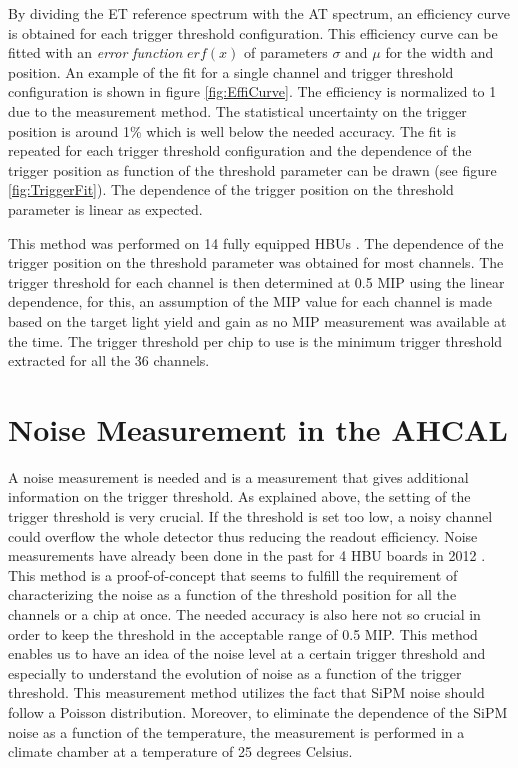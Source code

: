 By dividing the ET reference spectrum with the AT spectrum, an efficiency curve is obtained for each trigger threshold configuration. This efficiency curve can be fitted with an \textit{error function} $erf(x)$ of parameters $\sigma$ and $\mu$ for the width and position. An example of the fit for a single channel and trigger threshold configuration is shown in figure \ref{fig:EffiCurve}. The efficiency is normalized to 1 due to the measurement method. The statistical uncertainty on the trigger position is around 1\% which is well below the needed accuracy. The fit is repeated for each trigger threshold configuration and the dependence of the trigger position as function of the threshold parameter can be drawn (see figure \ref{fig:TriggerFit}). The dependence of the trigger position on the threshold parameter is linear as expected.

This method was performed on 14 fully equipped HBUs \cite{LloydTrigger}. The dependence of the trigger position on the threshold parameter was obtained for most channels. The trigger threshold for each channel is then determined at 0.5 MIP using the linear dependence, for this, an assumption of the MIP value for each channel is made based on the target light yield and gain as no MIP measurement was available at the time. The trigger threshold per chip to use is the minimum trigger threshold extracted for all the 36 channels.

\section{Noise Measurement in the AHCAL}

A noise measurement is needed and is a measurement that gives additional information on the trigger threshold. As explained above, the setting of the trigger threshold is very crucial. If the threshold is set too low, a noisy channel could overflow the whole detector thus reducing the readout efficiency. Noise measurements have already been done in the past for 4 HBU boards in 2012 \cite{Hermberg:2015gaa}. This method is a proof-of-concept that seems to fulfill the requirement of characterizing the noise as a function of the threshold position for all the channels or a chip at once. The needed accuracy is also here not so crucial in order to keep the threshold in the acceptable range of 0.5 MIP. This method enables us to have an idea of the noise level at a certain trigger threshold and especially to understand the evolution of noise as a function of the trigger threshold. This measurement method utilizes the fact that SiPM noise should follow a Poisson distribution. Moreover, to eliminate the dependence of the SiPM noise as a function of the temperature, the measurement is performed in a climate chamber at a temperature of 25 degrees Celsius.

